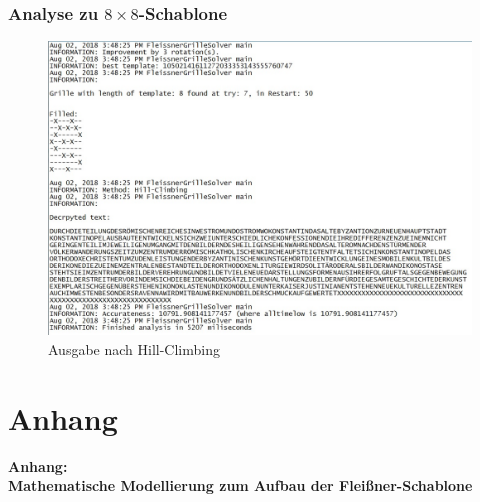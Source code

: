 \documentclass{beamer}
\begin{document}
\begin{frame}
\frametitle{Analyse zu $8 \times 8$-Schablone}
\begin{figure}
\includegraphics[scale=0.4]{Ausgabe8Mal8.jpg} 
\caption{Ausgabe nach Hill-Climbing}
\end{figure}
\end{frame}

\section{Anhang}\hypertarget{anhang}{}
\begin{frame}
\begin{center}
\textbf{\huge Anhang: \\Mathematische Modellierung zum Aufbau der Fleißner-Schablone}
\end{center}
\end{frame}
\end{document}

